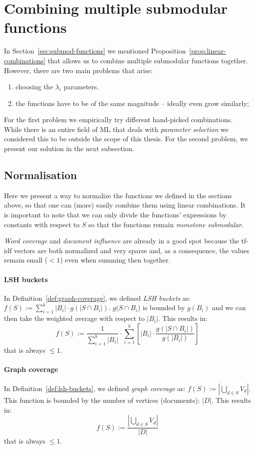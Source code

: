 \section{Combining multiple submodular functions}
\label{sec:combine}

In Section~\vref{sec:submod-functions} we mentioned
Proposition~\ref{prop:linear-combinations} that allows us to combine multiple
submodular functions together.
However, there are two main problems that arise:
\begin{enumerate}
  \item choosing the \(\lambda_i\) parameters.
  \item the functions have to be of the same magnitude -- ideally even grow
  similarly;
\end{enumerate}

For the first problem we empirically try different hand-picked combinations.
While there is an entire field of \ac{ML} that deals with \emph{parameter
selection} we considered this to be outside the scope of this thesis.
For the second problem, we present our solution in the next subsection.

\subsection{Normalisation}

Here we present a way to normalize the functions we defined in the sections
above, so that one can (more) easily combine them using linear combinations.
It is important to note that we can only divide the functions' expressions by
constants with respect to \(S\) so that the functions remain \emph{monotone
submodular}.

\emph{Word coverage} and \emph{document influence} are already in a good spot
because the tf-idf vectors are both normalized and very sparse and, as a
consequence, the values remain small (\(< 1\)) even when summing then together.

\paragraph{LSH buckets}
In Definition~\vref{def:graph-coverage}, we defined \emph{LSH buckets} as: \(f(S) := \sum_{i=1}^b |B_i| \cdot g(|S \cap
B_i|)\).  \(g(S \cap B_i\)) is bounded by \(g(B_i)\) and we can then take the
weighted average with respect to \(|B_i|\). This results in:
\[
  f(S) :=
    \frac{1}{\sum_{i=1}^b |B_i|} \cdot
    \sum_{i=1}^b \left[ |B_i| \cdot \frac{g(|S \cap B_i|)}{g(|B_i|)} \right]
\]
that is always \(\leq 1\).

\paragraph{Graph coverage}
In Definition~\vref{def:lsh-buckets}, we defined \emph{graph coverage} as:
\(f(S) := |\bigcup_{d \in S} V_d|\).
This function is bounded by the number of vertices (documents): \(|D|\). This
results in:
\[
  f(S) := \frac{|\bigcup_{d \in S} V_d|}{|D|}
\]
that is always \(\leq 1\).

